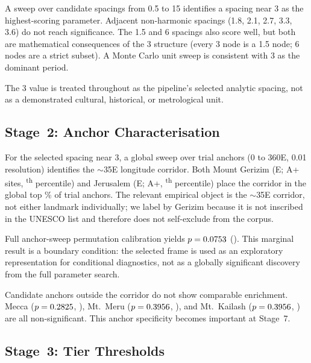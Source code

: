 \documentclass[12pt,a4paper]{article}
\newcommand{\degr}{\ifmmode{^\circ}\else\textdegree{}\fi}
\begin{document}
A sweep over candidate spacings from 0.5\textdegree{} to
15\textdegree{} identifies a spacing near 3\textdegree{} as the
highest-scoring parameter. Adjacent non-harmonic spacings (1.8\degr{},
2.1\degr{}, 2.7\degr{}, 3.3\degr{}, 3.6\degr{}) do not reach
significance. The 1.5\degr{} and 6\degr{} spacings also score well,
but both are mathematical consequences of the 3\degr{} structure (every
3\degr{} node is a 1.5\degr{} node; 6\degr{} nodes are a strict
subset). A Monte Carlo unit sweep is consistent with 3\degr{} as the
dominant period.

The 3\degr{} value is treated throughout as the pipeline's selected
analytic spacing, not as a demonstrated cultural, historical, or
metrological unit.

\subsection{Stage~2: Anchor Characterisation}

For the selected spacing near 3\degr{}, a global sweep over
\anchorSweepNanchors{} trial anchors (0\degr{} to 360\degr{}E,
0.01\degr{} resolution) identifies the $\sim$35\degr{}E longitude
corridor. Both Mount Gerizim (\GerizimLon\degr{}E;
\GerizimSweepAp{} A+ sites, \anchorSweepPctile\textsuperscript{th}
percentile) and Jerusalem (\JerusalemLon\degr{}E;
\JerusalemSweepAp{} A+,
\JerusalemSweepPctile\textsuperscript{th} percentile) place the
corridor in the global top \anchorSweepTopPct\% of trial anchors. The
relevant empirical object is the $\sim$35\degr{}E corridor, not either
landmark individually; we label by Gerizim because it is not inscribed
in the UNESCO list and therefore does not self-exclude from the corpus.

Full anchor-sweep permutation calibration yields
$p = 0.0753$ (\anchorMaxPermPSig{}). This marginal result is
a boundary condition: the selected frame is used as an exploratory
representation for conditional diagnostics, not as a globally
significant discovery from the full parameter search.

Candidate anchors outside the corridor do not show comparable
enrichment. Mecca ($p = 0.2825$, \pMeccaAnchorSig{}),
Mt.~Meru ($p = 0.3956$, \pMeruAnchorSig{}), and Mt.~Kailash
($p = 0.3956$, \pKailashAnchorSig{}) are all non-significant.
This anchor specificity becomes important at Stage~7.

\subsection{Stage~3: Tier Thresholds}
\end{document}
